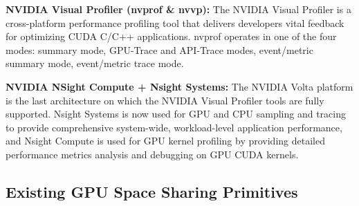 \documentclass{article}
\begin{document}
\textbf{NVIDIA Visual Profiler (nvprof \& nvvp):} The NVIDIA Visual Profiler \cite{nvprof} is a cross-platform performance profiling tool that delivers developers vital feedback for optimizing CUDA C/C++ applications. nvprof operates in one of the four modes: summary mode, GPU-Trace and API-Trace modes, event/metric summary mode, event/metric trace mode.


\textbf{NVIDIA NSight Compute + Nsight Systems:} The NVIDIA Volta platform is the last architecture on which the NVIDIA Visual Profiler tools are fully supported. Nsight Systems \cite{nsight_systems} is now used for GPU and CPU sampling and tracing to provide comprehensive system-wide, workload-level application performance, and Nsight Compute \cite{nsight_compute} is used for GPU kernel profiling by providing detailed performance metrics analysis and debugging on GPU CUDA kernels.





\subsection{Existing GPU Space Sharing Primitives}



\end{document}
